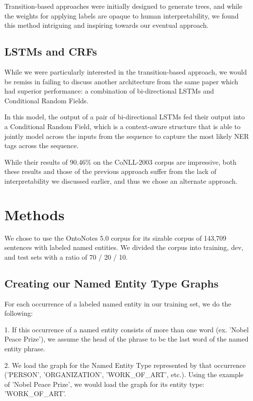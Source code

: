 \documentclass[11pt,a4paper]{article}
\begin{document}
Transition-based approaches were initially designed to generate trees, and while the weights for applying labels are opaque to human interpretability, we found this method intriguing and inspiring towards our eventual approach.

\subsection{LSTMs and CRFs}

While we were particularly interested in the transition-based approach, we would be remiss in failing to discuss another architecture from the same paper\cite{LampleNeuralArchitecturesNamed2016} which had superior performance: a combination of bi-directional LSTMs and Conditional Random Fields.

In this model, the output of a pair of bi-directional LSTMs fed their output into a Conditional Random Field, which is a context-aware structure that is able to jointly model across the inputs from the sequence to capture the most likely NER tags across the sequence.

While their results of 90.46\% on the CoNLL-2003 corpus are impressive, both these results and those of the previous approach suffer from the lack of interpretability we discussed earlier, and thus we chose an alternate approach.

\section{Methods} \label {methods}

We chose to use the OntoNotes 5.0 corpus for its sizable corpus of 143,709 sentences with labeled named entities. We divided the corpus into training, dev, and test sets with a ratio of 70 / 20 / 10.

\subsection{Creating our Named Entity Type Graphs} \label{construct_net}

For each occurrence of a labeled named entity in our training set, we do the following:

1. If this occurrence of a named entity consists of more than one word (ex. 'Nobel Peace Prize'), we assume the head of the phrase to be the last word of the named entity phrase.

2. We load the graph for the Named Entity Type represented by that occurrence ('PERSON', 'ORGANIZATION', 'WORK\_OF\_ART', etc.). Using the example of 'Nobel Peace Prize', we would load the graph for its entity type: 'WORK\_OF\_ART'.
\end{document}
